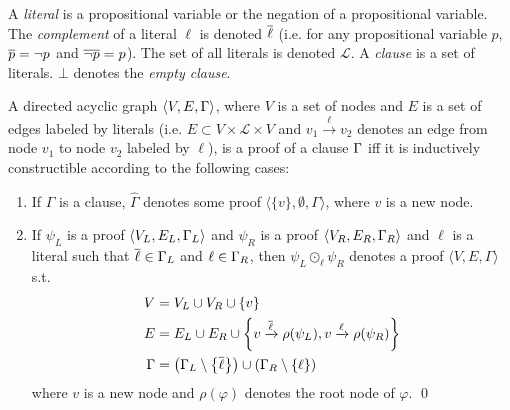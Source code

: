 \documentclass{llncs}
\begin{document}
A \emph{literal} is a propositional variable or the negation of a propositional variable. The
\emph{complement} of a literal $\ell$ is denoted $\overline{\ell}$ (i.e. for any propositional variable $p$,
$\overline{p} = \neg p$ and $\overline{\neg p} = p$). The set of all literals is denoted $\mathcal{L}$. A
\emph{clause} is a set of literals. $\bot$ denotes the \emph{empty clause}.


\newcommand{\axiom}[1]{\widehat{#1}}
\newcommand{\n}{v}
\newcommand{\raiz}[1]{\rho(#1)}

\begin{definition}[Proof] 
\label{def:proof}
A directed acyclic graph $\langle V, E, \Gamma \rangle$, where $V$ is a set of nodes and $E$ is a
set of edges labeled by literals (i.e. $E \subset V \times \mathcal{L} \times V$ and $\n_1
\xrightarrow{\ell} \n_2$ denotes an edge from node $\n_1$ to node $\n_2$ labeled by $\ell$), is a
proof of a clause $\Gamma$ iff it is inductively constructible according to the following cases:
%
\begin{enumerate}
  \item If $\Gamma$ is a clause, $\axiom{\Gamma}$ denotes some proof $\langle \{ \n \}, \emptyset ,
    \Gamma \rangle$, where $\n$ is a new node.
  \item If $\psi_L$ is a proof $\langle V_L, E_L, \Gamma_L \rangle$ and
    $\psi_R$ is a proof $\langle V_R, E_R, \Gamma_R \rangle$ and $\ell$ is a literal such that
    $\overline{\ell} \in \Gamma_L$ and $\ell \in \Gamma_R$, then
    $\psi_L \odot_\ell \psi_R$ denotes a proof $\langle V, E, \Gamma \rangle$ s.t.
    \begin{align*}
      V &= V_L \cup V_R \cup \{\n \} \\
      E &= E_L \cup E_R \cup
                    \left\{ \n \xrightarrow{\dual{\ell}} \raiz{\psi_L}, \n \xrightarrow{\ell} \raiz{\psi_R} \right\} \\
     \Gamma &= \left( \clause_L \setminus \left\{ \dual{\ell} \right\} \right) \cup \left( \clause_R
                    \setminus \left\{ \ell \right\} \right)
    \end{align*}
    where $\n$ is a new node and $\raiz{\varphi}$ denotes the root node of $\varphi$.
  \qed
\end{enumerate}
\end{definition}


\newcommand{\Vertices}[1]{V_{#1}}
\newcommand{\Edges}[1]{E_{#1}}
\newcommand{\Conclusion}[1]{\clause_{#1}}
\newcommand{\Premises}[2]{P_{#1}^{#2}}
\newcommand{\Children}[2]{C_{#1}^{#2}}
\newcommand{\Axioms}[1]{A_{#1}}
\end{document}

